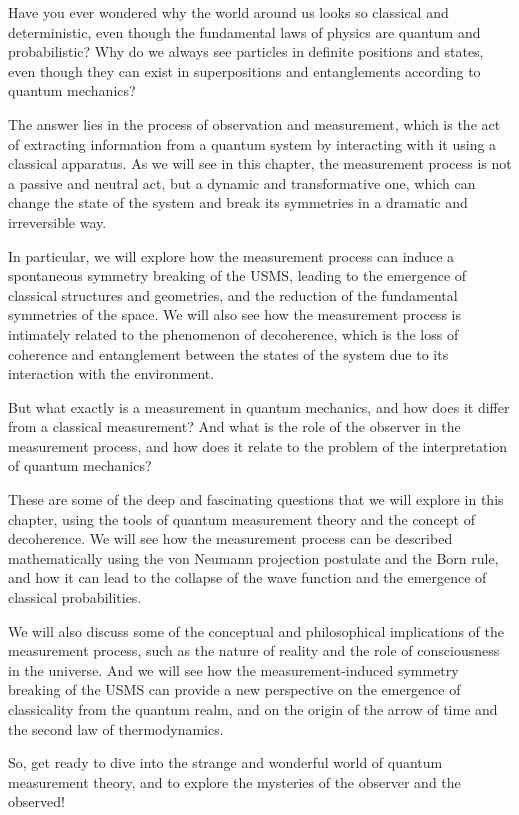 
Have you ever wondered why the world around us looks so classical and deterministic, even though the fundamental laws of physics are quantum and probabilistic? Why do we always see particles in definite positions and states, even though they can exist in superpositions and entanglements according to quantum mechanics?

The answer lies in the process of observation and measurement, which is the act of extracting information from a quantum system by interacting with it using a classical apparatus. As we will see in this chapter, the measurement process is not a passive and neutral act, but a dynamic and transformative one, which can change the state of the system and break its symmetries in a dramatic and irreversible way.

In particular, we will explore how the measurement process can induce a spontaneous symmetry breaking of the USMS, leading to the emergence of classical structures and geometries, and the reduction of the fundamental symmetries of the space. We will also see how the measurement process is intimately related to the phenomenon of decoherence, which is the loss of coherence and entanglement between the states of the system due to its interaction with the environment.

But what exactly is a measurement in quantum mechanics, and how does it differ from a classical measurement? And what is the role of the observer in the measurement process, and how does it relate to the problem of the interpretation of quantum mechanics?

These are some of the deep and fascinating questions that we will explore in this chapter, using the tools of quantum measurement theory and the concept of decoherence. We will see how the measurement process can be described mathematically using the von Neumann projection postulate and the Born rule, and how it can lead to the collapse of the wave function and the emergence of classical probabilities.

We will also discuss some of the conceptual and philosophical implications of the measurement process, such as the nature of reality and the role of consciousness in the universe. And we will see how the measurement-induced symmetry breaking of the USMS can provide a new perspective on the emergence of classicality from the quantum realm, and on the origin of the arrow of time and the second law of thermodynamics.

So, get ready to dive into the strange and wonderful world of quantum measurement theory, and to explore the mysteries of the observer and the observed!

